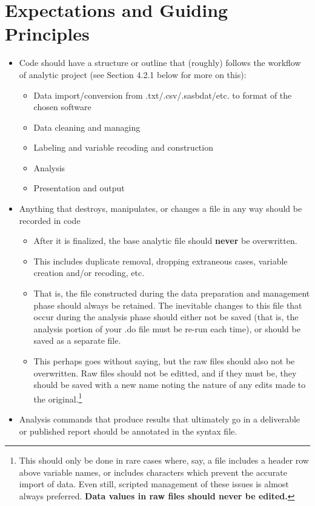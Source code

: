 \section{Expectations and Guiding Principles} \label{sec:expectations}
\begin{itemize}
\item Code should have a structure or outline that (roughly) follows the workflow of analytic project (see Section 4.2.1 below for more on this):
	\begin{itemize}
		\item Data import/conversion from .txt/.csv/.sasbdat/etc. to format of the chosen software
		\item Data cleaning and managing
		\item Labeling and variable recoding and construction
		\item Analysis
		\item Presentation and output
	\end{itemize}
\item Anything that destroys, manipulates, or changes a file in any way should be recorded in code
	\begin{itemize}
		\item After it is finalized, the base analytic file should \textbf{never} be overwritten.
		\item This includes duplicate removal, dropping extraneous cases, variable creation and/or recoding, etc.
		\item That is, the file constructed during the data preparation and management phase should always be retained. The inevitable changes to this file that occur during the analysis phase should either not be saved (that is, the analysis portion of your .do file must be re-run each time), or should be saved as a separate file.
		\item This perhaps goes without saying, but the raw files should also not be overwritten. Raw files should not be editted, and if they must be, they should be saved with a new name noting the nature of any edits made to the original.\footnote{This should only be done in rare cases where, say, a file includes a header row above variable names, or includes characters which prevent the accurate import of data. Even still, scripted management of these issues is almost always preferred. \bf{Data values in raw files should never be edited}.}
	\end{itemize}
\item Analysis commands that produce results that ultimately go in a deliverable or published report should be annotated in the syntax file.

\end{itemize}
